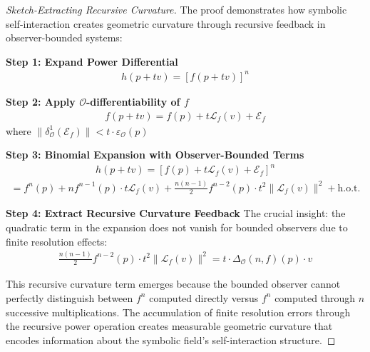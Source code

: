 \begin{proof}[Sketch-Extracting Recursive Curvature]
\label{proof:bk4_sketch_extracting_recrusive_curvature}
The proof demonstrates how symbolic self-interaction creates geometric curvature through recursive feedback in observer-bounded systems:

\textbf{Step 1: Expand Power Differential}
\begin{align}
h(p + tv) = [f(p + tv)]^n
\end{align}

\textbf{Step 2: Apply $\mathcal{O}$-differentiability of $f$}
\begin{align}
f(p + tv) = f(p) + t\mathcal{L}_f(v) + \mathcal{E}_f
\end{align}
where $\|\delta^1_{\mathcal{O}}(\mathcal{E}_f)\| < t \cdot \varepsilon_{\mathcal{O}}(p)$

\textbf{Step 3: Binomial Expansion with Observer-Bounded Terms}
\begin{align}
h(p + tv) = [f(p) + t\mathcal{L}_f(v) + \mathcal{E}_f]^n
\end{align}
\begin{align}
= f^n(p) + n f^{n-1}(p) \cdot t\mathcal{L}_f(v) + \frac{n(n-1)}{2} f^{n-2}(p) \cdot t^2\|\mathcal{L}_f(v)\|^2 + \text{h.o.t.}
\end{align}

\textbf{Step 4: Extract Recursive Curvature Feedback}
The crucial insight: the quadratic term in the expansion does not vanish for bounded observers due to finite resolution effects:
\begin{align}
\frac{n(n-1)}{2} f^{n-2}(p) \cdot t^2\|\mathcal{L}_f(v)\|^2 = t \cdot \Delta_{\mathcal{O}}(n, f)(p) \cdot v
\end{align}

This recursive curvature term emerges because the bounded observer cannot perfectly distinguish between $f^n$ computed directly versus $f^n$ computed through $n$ successive multiplications. The accumulation of finite resolution errors through the recursive power operation creates measurable geometric curvature that encodes information about the symbolic field's self-interaction structure.
\end{proof}

